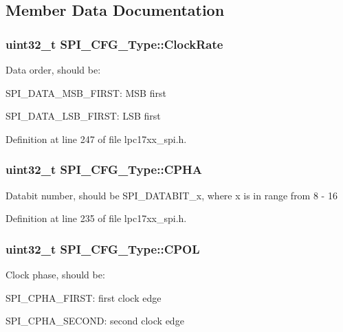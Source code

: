 \subsection{\-Member \-Data \-Documentation}
\hypertarget{struct_s_p_i___c_f_g___type_a27dd5b926ebaebf14115a7dba4cd8ebf}{
\subsubsection[{\-Clock\-Rate}]{\setlength{\rightskip}{0pt plus 5cm}uint32\-\_\-t {\bf \-S\-P\-I\-\_\-\-C\-F\-G\-\_\-\-Type\-::\-Clock\-Rate}}}\label{struct_s_p_i___c_f_g___type_a27dd5b926ebaebf14115a7dba4cd8ebf}
\-Data order, should be\-:
\begin{DoxyItemize}
\item \-S\-P\-I\-\_\-\-D\-A\-T\-A\-\_\-\-M\-S\-B\-\_\-\-F\-I\-R\-S\-T\-: \-M\-S\-B first
\item \-S\-P\-I\-\_\-\-D\-A\-T\-A\-\_\-\-L\-S\-B\-\_\-\-F\-I\-R\-S\-T\-: \-L\-S\-B first 
\end{DoxyItemize}

\-Definition at line 247 of file lpc17xx\-\_\-spi.\-h.

\hypertarget{struct_s_p_i___c_f_g___type_a6916f1b3bc90a2564ccbd8416f01f9e8}{
\subsubsection[{\-C\-P\-H\-A}]{\setlength{\rightskip}{0pt plus 5cm}uint32\-\_\-t {\bf \-S\-P\-I\-\_\-\-C\-F\-G\-\_\-\-Type\-::\-C\-P\-H\-A}}}\label{struct_s_p_i___c_f_g___type_a6916f1b3bc90a2564ccbd8416f01f9e8}
\-Databit number, should be \-S\-P\-I\-\_\-\-D\-A\-T\-A\-B\-I\-T\-\_\-x, where x is in range from 8 -\/ 16 

\-Definition at line 235 of file lpc17xx\-\_\-spi.\-h.

\hypertarget{struct_s_p_i___c_f_g___type_ac19401364df01434ecc911f4b299ab42}{
\subsubsection[{\-C\-P\-O\-L}]{\setlength{\rightskip}{0pt plus 5cm}uint32\-\_\-t {\bf \-S\-P\-I\-\_\-\-C\-F\-G\-\_\-\-Type\-::\-C\-P\-O\-L}}}\label{struct_s_p_i___c_f_g___type_ac19401364df01434ecc911f4b299ab42}
\-Clock phase, should be\-:
\begin{DoxyItemize}
\item \-S\-P\-I\-\_\-\-C\-P\-H\-A\-\_\-\-F\-I\-R\-S\-T\-: first clock edge
\item \-S\-P\-I\-\_\-\-C\-P\-H\-A\-\_\-\-S\-E\-C\-O\-N\-D\-: second clock edge 
\end{DoxyItemize}

